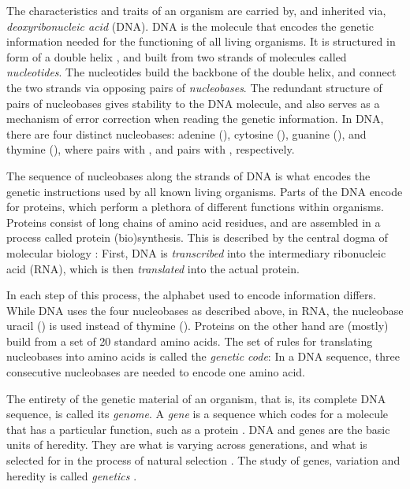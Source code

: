 
The characteristics and traits of an organism are carried by, and inherited via, \emph{deoxyribonucleic acid} (DNA).
DNA is the molecule that encodes the genetic information needed for the functioning of all living organisms.
It is structured in form of a double helix \cite{Watson1953},
and built from two strands of molecules called \emph{nucleotides}.
The nucleotides build the backbone of the double helix,
and connect the two strands via opposing pairs of \emph{nucleobases}.
The redundant structure of pairs of nucleobases gives stability to the DNA molecule,
and also serves as a mechanism of error correction when reading the genetic information.
In DNA, there are four distinct nucleobases:
adenine (), cytosine (), guanine (), and thymine (),
where  pairs with , and  pairs with , respectively.

The sequence of nucleobases along the strands of DNA is what encodes the genetic instructions
used by all known living organisms.
Parts of the DNA encode for proteins,
which perform a plethora of different functions within organisms.
Proteins consist of long chains of amino acid residues, and
are assembled in a process called protein (bio)synthesis.
This is described by the central dogma of molecular biology \cite{Crick1958,Crick1970}:
First, DNA is \emph{transcribed} into the intermediary ribonucleic acid (RNA),
which is then \emph{translated} into the actual protein.

In each step of this process, the alphabet used to encode information differs.
While DNA uses the four nucleobases as described above,
in RNA, the nucleobase uracil () is used instead of thymine ().
Proteins on the other hand are (mostly) build from a set of \num{20} standard amino acids.
The set of rules for translating nucleobases into amino acids is called the \emph{genetic code}:
In a DNA sequence, three consecutive nucleobases are needed to encode one amino acid.

The entirety of the genetic material of an organism, that is, its complete DNA sequence, is called its \emph{genome}.
A \emph{gene} is a sequence which codes for a molecule that has a particular function, such as a protein \cite{Gericke2007}.
DNA and genes are the basic units of heredity.
They are what is varying across generations,
and what is selected for in the process of natural selection \cite{Dawkins1989}.
The study of genes, variation and heredity is called \emph{genetics} \cite{Griffiths2000}.

